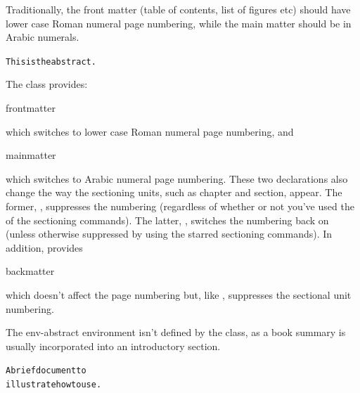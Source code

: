 Traditionally, the front matter (table of contents, list of figures
etc) should have lower case Roman numeral page numbering, while the
main matter should be in Arabic numerals.  

\begin{code}
\begin{alltt}


This is the abstract.

\end{alltt}
\end{code}

The  class provides:
\begin{definition}
\gls{frontmatter}
\end{definition}
which switches to lower case Roman numeral page numbering, and
\begin{definition}
\gls{mainmatter}
\end{definition}
which switches to Arabic numeral page numbering.
These two declarations also
change the way the sectioning units, such as \gls{chapter} and
\gls{section}, appear.  The former, ,
suppresses the numbering (regardless of whether or not you've used
the  of the sectioning commands). The latter,
, switches the numbering back on (unless
otherwise suppressed by using the starred sectioning commands). 
In addition,  provides
\begin{definition}
\gls{backmatter}
\end{definition}
which doesn't affect the page numbering but, like , suppresses the 
sectional unit numbering.


The \gls{env-abstract} environment isn't defined by the  class, as 
a book summary is usually incorporated into an introductory section.


\begin{code}
\begin{alltt}
\oarg{12pt}




A brief document to
illustrate how to use .



\end{alltt}
\end{code}

